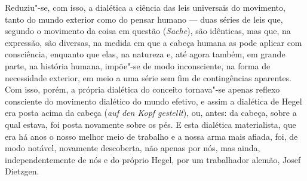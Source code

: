 Reduziu"-se, com isso, a dialética a ciência das leis universais do
movimento, tanto do mundo exterior como do pensar humano --- duas séries
de leis que, segundo o movimento da coisa em questão (\emph{Sache}), são
idênticas, mas que, na expressão, são diversas, na medida em que a
cabeça humana as pode aplicar com consciência, enquanto que elas, na
natureza e, até agora também, em grande parte, na história humana,
impõe"-se de modo inconsciente, na forma de necessidade exterior, em meio
a uma série sem fim de contingências aparentes. Com isso, porém, a
própria dialética do conceito tornava"-se apenas reflexo consciente do
movimento dialético do mundo efetivo, e assim a dialética
de Hegel era
posta acima da cabeça (\emph{auf den Kopf gestellt}), ou, antes: da
cabeça, sobre a qual estava, foi posta novamente sobre os pés. E esta
dialética materialista, que era há anos o nosso melhor meio de trabalho
e a nossa arma mais afiada, foi, de modo notável, novamente descoberta,
não apenas por nós, mas ainda, independentemente de nós e do próprio
Hegel,
por um trabalhador
alemão, Josef Dietzgen.

